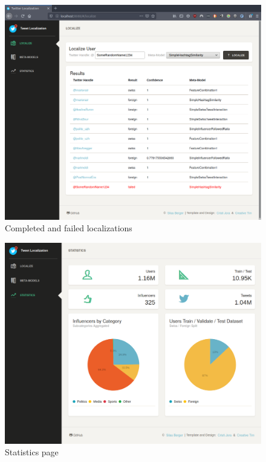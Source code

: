 \documentclass[10pt,a4paper]{article}
\begin{document}
\begin{figure}
	\centering
	\includegraphics[scale=0.25]{localize-many-results}
	\caption{Completed and failed localizations}
	\label{fig:localize-many-results}
\end{figure}

\begin{figure}
	\centering
	\includegraphics[scale=0.3]{statistics}
	\caption{Statistics page}
	\label{fig:statistics}
\end{figure}
\end{document}
